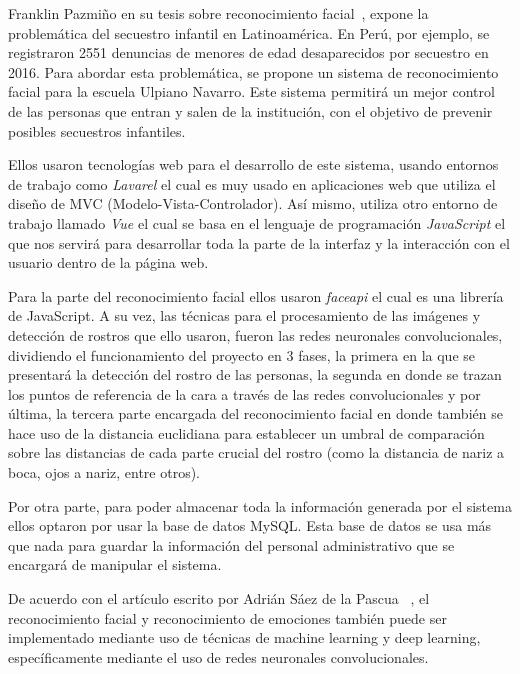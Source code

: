 Franklin Pazmiño en su tesis sobre reconocimiento facial~\cite{PUCE}, expone la problemática del secuestro infantil en Latinoamérica. 
En Perú, por ejemplo, se registraron 2551 denuncias de menores de edad desaparecidos por secuestro en 2016.
Para abordar esta problemática, se propone un sistema de reconocimiento facial para la escuela Ulpiano Navarro. Este sistema permitirá un mejor control de las personas que entran y salen de la institución, con el objetivo de prevenir posibles secuestros infantiles. 

Ellos usaron tecnologías web para el desarrollo de este sistema, usando entornos de trabajo como \textit{Lavarel} el cual es muy usado en aplicaciones web que utiliza el diseño de MVC (Modelo-Vista-Controlador). 
Así mismo, utiliza otro entorno de trabajo llamado \textit{Vue} el cual se basa en el lenguaje de programación \textit{JavaScript} el que nos servirá para desarrollar toda la parte de la interfaz y la interacción con el usuario dentro de la página web.

Para la parte del reconocimiento facial ellos usaron \textit{faceapi} el cual es una librería de JavaScript. A su vez, las técnicas para el procesamiento de las imágenes y detección de rostros que ello usaron, fueron las redes neuronales convolucionales, dividiendo el funcionamiento del proyecto en 3 fases, la primera en la que se presentará la detección del rostro de las personas, la segunda en donde se trazan los puntos de referencia de la cara a través de las redes convolucionales y por última, la tercera parte encargada del reconocimiento facial en donde también se hace uso de la distancia euclidiana para establecer un umbral de comparación sobre las distancias de cada parte crucial del rostro (como la distancia de nariz a boca, ojos a nariz, entre otros).

Por otra parte, para poder almacenar toda la información generada por el sistema ellos optaron por usar la base de datos MySQL. Esta base de datos se usa más que nada para guardar la información del personal administrativo que se encargará de manipular el sistema.\newline


De acuerdo con el artículo escrito por Adrián Sáez de la Pascua ~\cite{D1}, el reconocimiento facial y reconocimiento de emociones también puede ser implementado mediante uso de técnicas de machine learning y deep learning, específicamente mediante el uso de redes neuronales convolucionales. 


